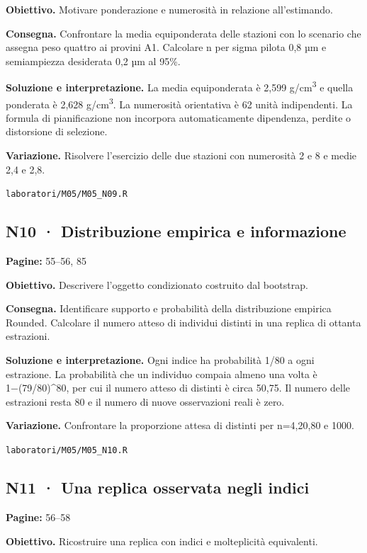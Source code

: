 \documentclass[11pt,a4paper]{article}
\begin{document}
\textbf{Obiettivo.} Motivare ponderazione e numerosità in relazione all’estimando.

\textbf{Consegna.} Confrontare la media equiponderata delle stazioni con lo scenario che assegna peso quattro ai provini A1. Calcolare n per sigma pilota 0,8 µm e semiampiezza desiderata 0,2 µm al 95\%.

\textbf{Soluzione e interpretazione.} La media equiponderata è 2,599 g/cm\textsuperscript{3} e quella ponderata è 2,628 g/cm\textsuperscript{3}. La numerosità orientativa è 62 unità indipendenti. La formula di pianificazione non incorpora automaticamente dipendenza, perdite o distorsione di selezione.

\textbf{Variazione.} Risolvere l’esercizio delle due stazioni con numerosità 2 e 8 e medie 2,4 e 2,8.

\texttt{laboratori/M05/M05\_N09.R}

\subsection*{N10 · Distribuzione empirica e informazione}

\textbf{Pagine:} 55–56, 85

\textbf{Obiettivo.} Descrivere l’oggetto condizionato costruito dal bootstrap.

\textbf{Consegna.} Identificare supporto e probabilità della distribuzione empirica Rounded. Calcolare il numero atteso di individui distinti in una replica di ottanta estrazioni.

\textbf{Soluzione e interpretazione.} Ogni indice ha probabilità 1/80 a ogni estrazione. La probabilità che un individuo compaia almeno una volta è 1−(79/80)\textasciicircum{}80, per cui il numero atteso di distinti è circa 50,75. Il numero delle estrazioni resta 80 e il numero di nuove osservazioni reali è zero.

\textbf{Variazione.} Confrontare la proporzione attesa di distinti per n=4,20,80 e 1000.

\texttt{laboratori/M05/M05\_N10.R}

\newpage

\subsection*{N11 · Una replica osservata negli indici}

\textbf{Pagine:} 56–58

\textbf{Obiettivo.} Ricostruire una replica con indici e molteplicità equivalenti.
\end{document}
